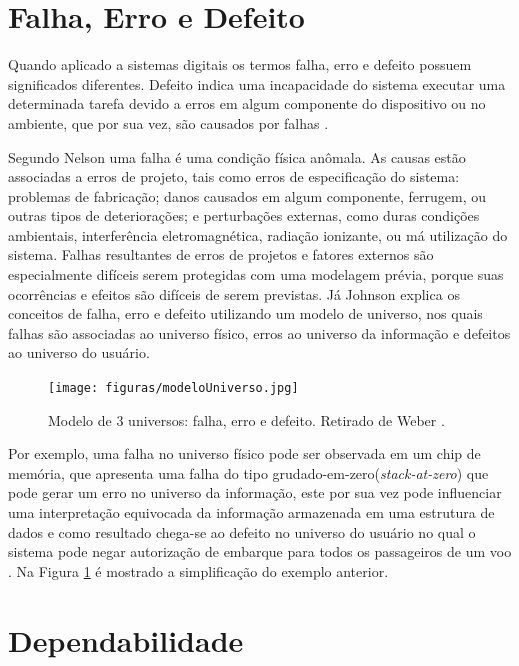 \documentclass[a4paper,12pt,brazil]{ufms-cpcx}
\begin{document}
              



\section{Falha, Erro e Defeito} \label{sec:falhaErroDefeito}

Quando aplicado a sistemas digitais os termos falha, erro e defeito possuem significados diferentes. Defeito indica uma incapacidade do sistema executar uma determinada tarefa devido a erros em algum componente do dispositivo ou no ambiente, que por sua vez, são causados por falhas \cite{Nelson:1990}.

Segundo Nelson \cite{Nelson:1990} uma falha é uma condição física anômala. As causas estão associadas a erros de projeto, tais como erros de especificação do sistema: problemas de fabricação; danos causados em algum componente, ferrugem, ou outras tipos de deteriorações; e perturbações externas, como duras condições ambientais, interferência eletromagnética, radiação ionizante, ou má utilização do sistema. Falhas resultantes de erros de projetos e fatores externos são especialmente difíceis serem protegidas com uma modelagem prévia, porque suas ocorrências e efeitos são difíceis de serem previstas. Já Johnson \cite{Pradhan:1996} explica os conceitos de falha, erro e defeito utilizando um modelo de universo, nos quais falhas são associadas ao universo físico, erros ao universo da informação e defeitos ao universo do usuário. 

\begin{figure}[H]
	\centering
	\texttt{[image: figuras/modeloUniverso.jpg]}
	\caption{Modelo de 3 universos: falha, erro e defeito. Retirado de Weber \cite{Weber:2002}.}
	\label{Img:modeloUniverso}	
\end{figure}

Por exemplo, uma falha no universo físico pode ser observada em um chip de memória, que apresenta uma falha do tipo grudado-em-zero(\textit{stack-at-zero}) que pode gerar um erro no universo da informação, este por sua vez pode influenciar uma interpretação equivocada da informação armazenada em uma estrutura de dados e como resultado chega-se ao defeito no universo do usuário no qual o sistema pode negar autorização de embarque para todos os passageiros de um voo \cite{Nelson:1990}. Na Figura \ref{Img:modeloUniverso} é mostrado a simplificação do exemplo anterior.


\section{Dependabilidade}
\end{document}
